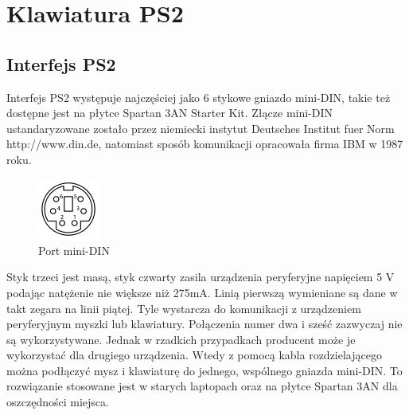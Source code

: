 \documentclass[a4paper,12pt]{article}
\begin{document}



\newpage
\section{Klawiatura PS2}

\subsection{Interfejs PS2}

Interfejs PS2 występuje najczęściej jako 6 stykowe gniazdo mini-DIN, takie też dostępne jest na płytce Spartan 3AN Starter Kit. Złącze mini-DIN ustandaryzowane zostało przez niemiecki instytut Deutsches Institut fuer Norm http://www.din.de, natomiast sposób komunikacji opracowała firma IBM w 1987 roku.

\begin{figure}[htb]
   \centering
   \includegraphics[width=2cm]{grafika/150px-MiniDIN-6_Connector_Pinout.png}
   \caption{Port mini-DIN}
\end{figure}

Styk trzeci jest masą, styk czwarty zasila urządzenia peryferyjne napięciem 5 V podając natężenie nie większe niż 275mA. Linią pierwszą wymieniane są dane w takt zegara na linii piątej. Tyle wystarcza do komunikacji z urządzeniem peryferyjnym myszki lub klawiatury. Połączenia numer dwa i sześć zazwyczaj nie są wykorzystywane. Jednak w rzadkich przypadkach producent może je wykorzystać dla drugiego urządzenia. Wtedy z pomocą kabla rozdzielającego można podłączyć mysz i klawiaturę do jednego, wspólnego gniazda mini-DIN. To rozwiązanie stosowane jest w starych laptopach oraz na płytce Spartan 3AN dla oszczędności miejsca.
\end{document}
